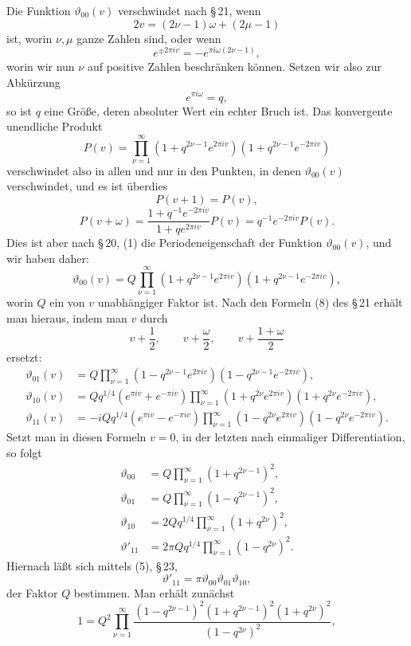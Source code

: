 \documentclass[11pt]{article}
\providecommand{\tht}{\vartheta}
\begin{document}
Die Funktion $\tht_{00}(v)$ verschwindet nach \S\,21, wenn
\[
2v=(2\nu-1)\omega+(2\mu-1)
\]
ist, worin $\nu,\mu$ ganze Zahlen sind, oder wenn
\[
e^{\pm2\pi iv}=-e^{\pi i\omega(2\nu-1)},
\]
worin wir nun $\nu$ auf positive Zahlen beschränken können. Setzen wir also zur Abkürzung
\[
e^{\pi i\omega}=q,
\]
so ist $q$ eine Größe, deren absoluter Wert ein echter Bruch ist. Das konvergente unendliche Produkt
\[
P(v)=\prod_{\nu=1}^{\infty}(1+q^{2\nu-1}e^{2\pi iv})(1+q^{2\nu-1}e^{-2\pi iv})
\]
verschwindet also in allen und nur in den Punkten, in denen $\tht_{00}(v)$ verschwindet, und es ist überdies
\[
P(v+1)=P(v),
\]
\[
P(v+\omega)=\frac{1+q^{-1}e^{-2\pi iv}}{1+qe^{2\pi iv}}P(v)=q^{-1}e^{-2\pi iv}P(v).
\]
Dies ist aber nach \S\,20, (1) die Periodeneigenschaft der Funktion $\tht_{00}(v)$, und wir haben daher:
\begin{equation}
\tht_{00}(v)=Q\prod_{\nu=1}^{\infty}(1+q^{2\nu-1}e^{2\pi iv})(1+q^{2\nu-1}e^{-2\pi iv}),
\tag{1}
\end{equation}
worin $Q$ ein von $v$ unabhängiger Faktor ist. Nach den Formeln (8) des \S\,21 erhält man hieraus, indem man $v$ durch
\[
v+\frac12,\qquad v+\frac\omega2,\qquad v+\frac{1+\omega}{2}
\]
ersetzt:
\begin{align}
\tht_{01}(v)&=Q\prod_{\nu=1}^{\infty}(1-q^{2\nu-1}e^{2\pi iv})(1-q^{2\nu-1}e^{-2\pi iv}), \tag{2}\\
\tht_{10}(v)&=Qq^{1/4}(e^{\pi iv}+e^{-\pi iv})\prod_{\nu=1}^{\infty}(1+q^{2\nu}e^{2\pi iv})(1+q^{2\nu}e^{-2\pi iv}), \tag{3}\\
\tht_{11}(v)&=-iQq^{1/4}(e^{\pi iv}-e^{-\pi iv})\prod_{\nu=1}^{\infty}(1-q^{2\nu}e^{2\pi iv})(1-q^{2\nu}e^{-2\pi iv}). \tag{4}
\end{align}
Setzt man in diesen Formeln $v=0$, in der letzten nach einmaliger Differentiation, so folgt
\begin{equation}
\begin{aligned}
\tht_{00}&=Q\prod_{\nu=1}^{\infty}(1+q^{2\nu-1})^2,\\
\tht_{01}&=Q\prod_{\nu=1}^{\infty}(1-q^{2\nu-1})^2,\\
\tht_{10}&=2Qq^{1/4}\prod_{\nu=1}^{\infty}(1+q^{2\nu})^2,\\
\tht'_{11}&=2\pi Qq^{1/4}\prod_{\nu=1}^{\infty}(1-q^{2\nu})^2.
\end{aligned}
\tag{5}
\end{equation}
Hiernach läßt sich mittels (5), \S\,23,
\[
\tht'_{11}=\pi\tht_{00}\tht_{01}\tht_{10},
\]
der Faktor $Q$ bestimmen. Man erhält zunächst
\[
1=Q^2\prod_{\nu=1}^{\infty}\frac{(1-q^{2\nu-1})^2(1+q^{2\nu-1})^2(1+q^{2\nu})^2}{(1-q^{2\nu})^2},
\]
\end{document}
